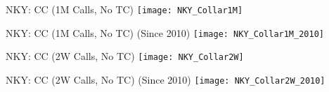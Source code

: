 \documentclass{beamer}
\begin{document}
\begin{frame}{NKY: CC (1M Calls, No TC)}
\texttt{[image: NKY\_Collar1M]}
\end{frame}

\begin{frame}{NKY: CC (1M Calls, No TC) (Since 2010)}
\texttt{[image: NKY\_Collar1M\_2010]}
\end{frame}

\begin{frame}{NKY: CC (2W Calls, No TC)}
\texttt{[image: NKY\_Collar2W]}
\end{frame}

\begin{frame}{NKY: CC (2W Calls, No TC) (Since 2010)}
\texttt{[image: NKY\_Collar2W\_2010]}
\end{frame}
\end{document}
